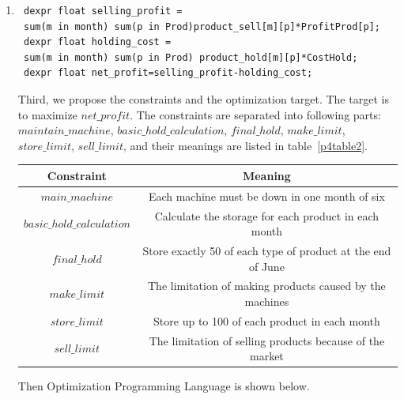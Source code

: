 \documentclass[12pt,a4paper]{article}
\makeatletter
\newtheorem*{solution}{Solution}
\theoremstyle{definition}
\renewenvironment{solution}[1][Solution] {\par\pushQED{\qed}\normalfont\topsep6\p@\@plus6\p@\relax\trivlist\item[\hskip\labelsep\bfseries#1\@addpunct{.}]\ignorespaces}{\popQED\endtrivlist\@endpefalse} \makeatother
\makeatother
\begin{document}
\begin{enumerate}
\begin{enumerate}
\begin{solution}
\begin{lstlisting}
 dexpr float selling_profit = 
 sum(m in month) sum(p in Prod)product_sell[m][p]*ProfitProd[p];
 dexpr float holding_cost = 
 sum(m in month) sum(p in Prod) product_hold[m][p]*CostHold;
 dexpr float net_profit=selling_profit-holding_cost;
\end{lstlisting}

Third, we propose the constraints and the optimization target. The target is to maximize $net\_profit$. The constraints are separated into following parts: $maintain\_machine$, $basic\_hold\_calculation$, $final\_hold$, $make\_limit$,$store\_limit$, $sell\_limit$, and their meanings are listed in table~\ref{p4table2}.

\begin{center}
    \begin{tabular}{|c|c|}
    \hline
    \label{p4table2}
     Constraint    &  Meaning\\
     \hline
       $main\_machine$  & Each machine must be down in one month of six \\
       $basic\_hold\_calculation$ & Calculate the storage for each product in each month \\
       $final\_hold$ & Store exactly 50 of each type of product at the end of June \\
       $make\_limit$ & The limitation of making products caused by the machines \\
       $store\_limit$ & Store up to 100 of each product in each month \\
       $sell\_limit$ & The limitation of selling products because of the market\\
       \hline
    \end{tabular}
\end{center}

Then Optimization Programming Language is shown below.


\end{solution}
\end{enumerate}
\end{enumerate}
\end{document}
